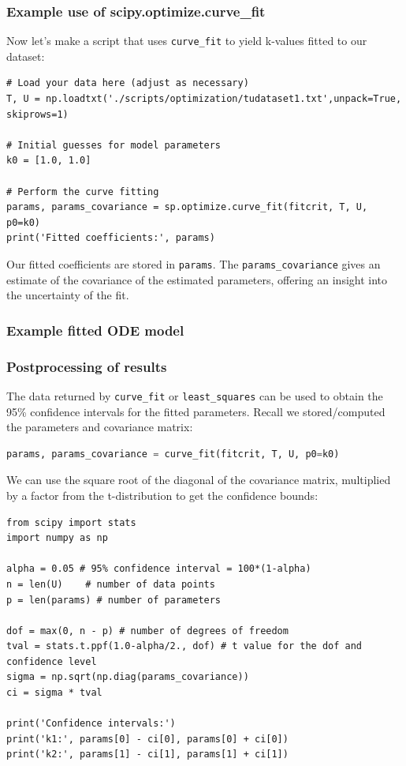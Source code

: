     \begin{frame}[fragile] 
    \frametitle{Example use of scipy.optimize.curve\_fit}
    Now let's make a script that uses \lstinline$curve_fit$ to yield k-values fitted to our dataset:
    \pause
    \begin{lstlisting}
# Load your data here (adjust as necessary)
T, U = np.loadtxt('./scripts/optimization/tudataset1.txt',unpack=True, skiprows=1)

# Initial guesses for model parameters
k0 = [1.0, 1.0]

# Perform the curve fitting
params, params_covariance = sp.optimize.curve_fit(fitcrit, T, U, p0=k0)
print('Fitted coefficients:', params)
    \end{lstlisting}
    Our fitted coefficients are stored in \lstinline|params|. The \lstinline|params_covariance| gives an estimate of the covariance of the estimated parameters, offering an insight into the uncertainty of the fit.
    \end{frame}      

\begin{frame}[fragile] 
  \frametitle{Example fitted ODE model}
  \centering
\end{frame}


\begin{frame}[fragile,label={postprocess_fit}] 
  \frametitle{Postprocessing of results}
  The data returned by \lstinline|curve_fit| or \lstinline|least_squares| can be used to obtain the 95\% confidence intervals for the fitted parameters. Recall we stored/computed the parameters and covariance matrix:
  \begin{lstlisting}[language=Python]
params, params_covariance = curve_fit(fitcrit, T, U, p0=k0)
  \end{lstlisting}
  We can use the square root of the diagonal of the covariance matrix, multiplied by a factor from the t-distribution to get the confidence bounds:
  \begin{lstlisting}
from scipy import stats
import numpy as np

alpha = 0.05 # 95% confidence interval = 100*(1-alpha)
n = len(U)    # number of data points
p = len(params) # number of parameters

dof = max(0, n - p) # number of degrees of freedom
tval = stats.t.ppf(1.0-alpha/2., dof) # t value for the dof and confidence level
sigma = np.sqrt(np.diag(params_covariance))
ci = sigma * tval

print('Confidence intervals:')
print('k1:', params[0] - ci[0], params[0] + ci[0])
print('k2:', params[1] - ci[1], params[1] + ci[1])
  \end{lstlisting}
  \end{frame}

